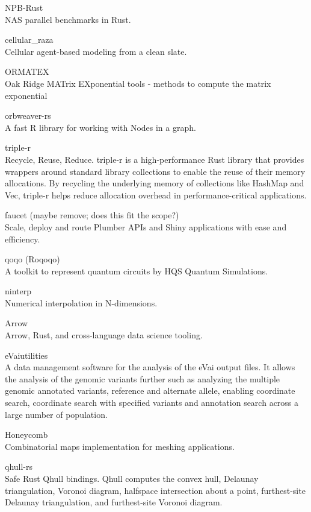 \documentclass{article}
\begin{document}
NPB-Rust\\
NAS parallel benchmarks in Rust. \cite{martins2025npbrustnasparallelbenchmarks}

cellular\_raza\\
Cellular agent-based modeling from a clean slate.

ORMATEX\\
Oak Ridge MATrix EXponential tools - methods to compute the matrix exponential

orbweaver-rs\\
A fast R library for working with Nodes in a graph.

triple-r\\
Recycle, Reuse, Reduce. triple-r is a high-performance Rust library that provides
wrappers around standard library collections to enable the reuse of their memory allocations. By
recycling the underlying memory of collections like HashMap and Vec, triple-r helps reduce
allocation overhead in performance-critical applications.

faucet (maybe remove; does this fit the scope?)\\
Scale, deploy and route Plumber APIs and Shiny
applications with ease and efficiency.

qoqo (Roqoqo)\\
A toolkit to represent quantum circuits by HQS Quantum Simulations.

ninterp\\
Numerical interpolation in N-dimensions.

Arrow\\
Arrow, Rust, and cross-language data science tooling.

eVaiutilities\\
A data management software for the analysis of the eVai output files. It allows the
analysis of the genomic variants further such as analyzing the multiple genomic annotated variants,
reference and alternate allele, enabling coordinate search, coordinate search with specified
variants and annotation search across a large number of population.

Honeycomb\\
Combinatorial maps implementation for meshing applications.

qhull-rs\\
Safe Rust Qhull bindings. Qhull computes the convex hull, Delaunay triangulation,
Voronoi diagram, halfspace intersection about a point, furthest-site Delaunay triangulation, and
furthest-site Voronoi diagram.
\end{document}
